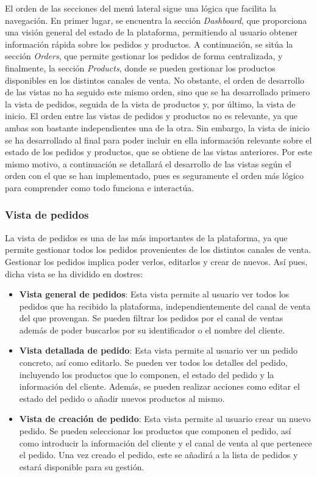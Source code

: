 El orden de las secciones del menú lateral sigue una lógica que facilita la navegación. En primer lugar, se encuentra la sección \textit{Dashboard}, que proporciona una visión general del estado de la plataforma, permitiendo al usuario obtener información rápida sobre los pedidos y productos. A continuación, se sitúa la sección \textit{Orders}, que permite gestionar los pedidos de forma centralizada, y finalmente, la sección \textit{Products}, donde se pueden gestionar los productos disponibles en los distintos canales de venta. No obstante, el orden de desarrollo de las vistas no ha seguido este mismo orden, sino que se ha desarrollado primero la vista de pedidos, seguida de la vista de productos y, por último, la vista de inicio. El orden entre las vistas de pedidos y productos no es relevante, ya que ambas son bastante independientes una de la otra. Sin embargo, la vista de inicio se ha desarrollado al final para poder incluir en ella información relevante sobre el estado de los pedidos y productos, que se obtiene de las vistas anteriores. Por este mismo motivo, a continuación se detallará el desarrollo de las vistas según el orden con el que se han implementado, pues es seguramente el orden más lógico para comprender como todo funciona e interactúa.

\subsubsection{Vista de pedidos}
\label{dev:subsubsec:vista_pedidos}

La vista de pedidos es una de las más importantes de la plataforma, ya que permite gestionar todos los pedidos provenientes de los distintos canales de venta. Gestionar los pedidos implica poder verlos, editarlos y crear de nuevos. Así pues, dicha vista se ha dividido en dostres:

\begin{itemize}
    \item \textbf{Vista general de pedidos}: Esta vista permite al usuario ver todos los pedidos que ha recibido la plataforma, independientemente del canal de venta del que provengan. Se pueden filtrar los pedidos por el canal de ventas además de poder buscarlos por su identificador o el nombre del cliente.
    \item \textbf{Vista detallada de pedido}: Esta vista permite al usuario ver un pedido concreto, así como editarlo. Se pueden ver todos los detalles del pedido, incluyendo los productos que lo componen, el estado del pedido y la información del cliente. Además, se pueden realizar acciones como editar el estado del pedido o añadir nuevos productos al mismo.
    \item \textbf{Vista de creación de pedido}: Esta vista permite al usuario crear un nuevo pedido. Se pueden seleccionar los productos que componen el pedido, así como introducir la información del cliente y el canal de venta al que pertenece el pedido. Una vez creado el pedido, este se añadirá a la lista de pedidos y estará disponible para su gestión.
\end{itemize}


